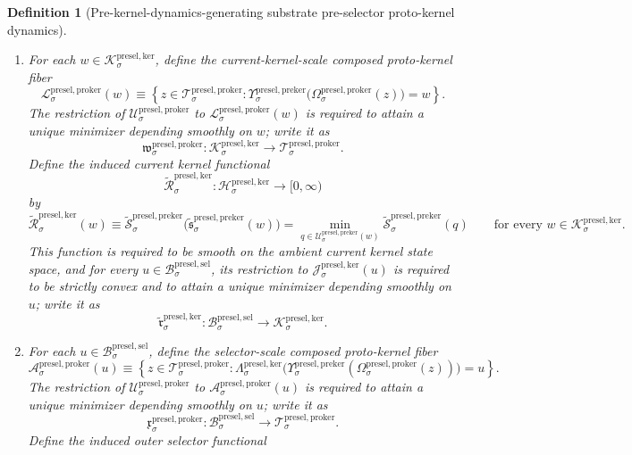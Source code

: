 \documentclass[11pt]{article}
\newcommand{\PreSectionSelectorBody}[1]{\mathcal B_{#1}^{\mathrm{presel,sel}}}
\newcommand{\KernelSpace}[1]{\mathcal H_{#1}^{\mathrm{presel,ker}}}
\newcommand{\KernelBody}[1]{\mathcal K_{#1}^{\mathrm{presel,ker}}}
\newcommand{\KernelProj}[1]{\Lambda_{#1}^{\mathrm{presel,ker}}}
\newcommand{\KernelFiber}[2]{\mathcal J_{#1}^{\mathrm{presel,ker}}(#2)}
\newcommand{\PreKernelBody}[1]{\mathcal P_{#1}^{\mathrm{presel,preker}}}
\newcommand{\PreKernelProj}[1]{\Upsilon_{#1}^{\mathrm{presel,preker}}}
\newcommand{\PreKernelFiber}[2]{\mathcal U_{#1}^{\mathrm{presel,preker}}(#2)}
\newcommand{\ProtoKernelBody}[1]{\mathcal T_{#1}^{\mathrm{presel,proker}}}
\newcommand{\ProtoKernelProj}[1]{\Omega_{#1}^{\mathrm{presel,proker}}}
\newcommand{\ProtoKernelFunctional}[1]{\mathscr U_{#1}^{\mathrm{presel,proker}}}
\newcommand{\ProtoKernelKernelFiber}[2]{\mathcal L_{#1}^{\mathrm{presel,proker}}(#2)}
\newcommand{\ProtoKernelKernelMin}[1]{\mathfrak w_{#1}^{\mathrm{presel,proker}}}
\newcommand{\ProtoKernelSelectorFiber}[2]{\mathcal A_{#1}^{\mathrm{presel,proker}}(#2)}
\newcommand{\ProtoKernelSelectorMin}[1]{\mathfrak x_{#1}^{\mathrm{presel,proker}}}
\newcommand{\InducedKernelFunctional}[1]{\widetilde{\mathscr R}_{#1}^{\mathrm{presel,ker}}}
\newcommand{\InducedKernelMinLift}[1]{\widetilde{\mathfrak r}_{#1}^{\mathrm{presel,ker}}}
\newcommand{\InducedPreKernelFunctional}[1]{\widetilde{\mathscr S}_{#1}^{\mathrm{presel,preker}}}
\newcommand{\InducedPreKernelMinLift}[1]{\widetilde{\mathfrak s}_{#1}^{\mathrm{presel,preker}}}
\newtheorem{definition}{Definition}
\begin{document}
\begin{definition}[Pre-kernel-dynamics-generating substrate pre-selector proto-kernel dynamics]
\begin{enumerate}
\[    \ProtoKernelFunctional{\sigma}(z)
    \qquad
    \text{for every }
    q\in\PreKernelBody{\sigma}.
    \]
    Moreover, for every \(w\in\KernelBody{\sigma}\), the restriction of \(\InducedPreKernelFunctional{\sigma}\) to \(\PreKernelFiber{\sigma}{w}\) is strictly convex and attains a unique minimizer depending smoothly on \(w\); write it as
    \[
    \InducedPreKernelMinLift{\sigma}:\KernelBody{\sigma}\to\PreKernelBody{\sigma}.
    \]
    \item For each \(w\in\KernelBody{\sigma}\), define the current-kernel-scale composed proto-kernel fiber
    \[
    \ProtoKernelKernelFiber{\sigma}{w}
    \equiv
    \left\{
    z\in\ProtoKernelBody{\sigma}:
    \PreKernelProj{\sigma}\bigl(\ProtoKernelProj{\sigma}(z)\bigr)=w
    \right\}.
    \]
    The restriction of \(\ProtoKernelFunctional{\sigma}\) to \(\ProtoKernelKernelFiber{\sigma}{w}\) is required to attain a unique minimizer depending smoothly on \(w\); write it as
    \[
    \ProtoKernelKernelMin{\sigma}:\KernelBody{\sigma}\to\ProtoKernelBody{\sigma}.
    \]
    Define the induced current kernel functional
    \[
    \InducedKernelFunctional{\sigma}:\KernelSpace{\sigma}\to[0,\infty)
    \]
    by
    \[
    \InducedKernelFunctional{\sigma}(w)
    \equiv
    \InducedPreKernelFunctional{\sigma}\bigl(\InducedPreKernelMinLift{\sigma}(w)\bigr)
    =
    \min_{q\in\PreKernelFiber{\sigma}{w}}
    \InducedPreKernelFunctional{\sigma}(q)
    \qquad
    \text{for every }
    w\in\KernelBody{\sigma}.
    \]
    This function is required to be smooth on the ambient current kernel state space, and for every \(u\in\PreSectionSelectorBody{\sigma}\), its restriction to \(\KernelFiber{\sigma}{u}\) is required to be strictly convex and to attain a unique minimizer depending smoothly on \(u\); write it as
    \[
    \InducedKernelMinLift{\sigma}:\PreSectionSelectorBody{\sigma}\to\KernelBody{\sigma}.
    \]
    \item For each \(u\in\PreSectionSelectorBody{\sigma}\), define the selector-scale composed proto-kernel fiber
    \[
    \ProtoKernelSelectorFiber{\sigma}{u}
    \equiv
    \left\{
    z\in\ProtoKernelBody{\sigma}:
    \KernelProj{\sigma}\bigl(\PreKernelProj{\sigma}(\ProtoKernelProj{\sigma}(z))\bigr)=u
    \right\}.
    \]
    The restriction of \(\ProtoKernelFunctional{\sigma}\) to \(\ProtoKernelSelectorFiber{\sigma}{u}\) is required to attain a unique minimizer depending smoothly on \(u\); write it as
    \[
    \ProtoKernelSelectorMin{\sigma}:\PreSectionSelectorBody{\sigma}\to\ProtoKernelBody{\sigma}.
    \]
    Define the induced outer selector functional

\end{enumerate}
\end{definition}
\end{document}

